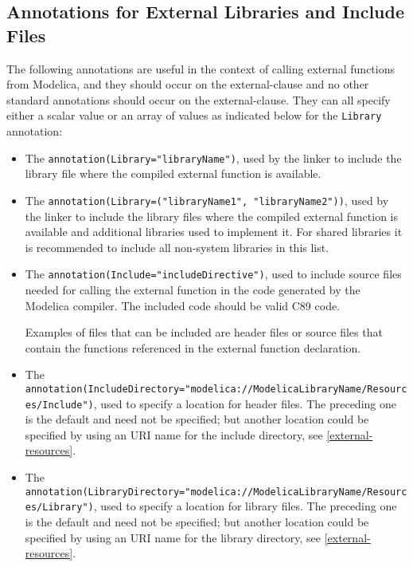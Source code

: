 \subsection{Annotations for External Libraries and Include Files}\label{annotations-for-external-libraries-and-include-files}

The following annotations are useful in the context of calling external functions from Modelica, and they should occur on the external-clause and no other standard annotations should occur on the external-clause.
They can all specify either a scalar value or an array of values as indicated below for the \lstinline!Library! annotation:
\begin{itemize}
\item
  The \lstinline!annotation(Library="libraryName")!, used by the linker to include the library file where the compiled external function is available.
\item
  The \lstinline!annotation(Library=("libraryName1", "libraryName2"))!, used by the linker to include the library files where the compiled external function is available and additional libraries used to implement it.
  For shared libraries it is recommended to include all non-system libraries in this list.
\item
  The \lstinline!annotation(Include="includeDirective")!, used to include source files needed for calling the external function in the code generated by the Modelica compiler.
  The included code should be valid C89 code.
  \begin{nonnormative}
  Examples of files that can be included are header files or source files that contain the functions referenced in the external function declaration.
  \end{nonnormative}
\item
  The
  \lstinline!annotation(IncludeDirectory="modelica://ModelicaLibraryName/Resources/Include")!, used to specify a location for header files.
  The preceding one is the default and need not be specified; but another location could be specified by using an URI name for the include directory, see \cref{external-resources}.
\item
  The
  \lstinline!annotation(LibraryDirectory="modelica://ModelicaLibraryName/Resources/Library")!, used to specify a location for library files.
  The preceding one is the default and need not be specified; but another location could be specified by using an URI name for the library directory, see \cref{external-resources}.

\end{itemize}
